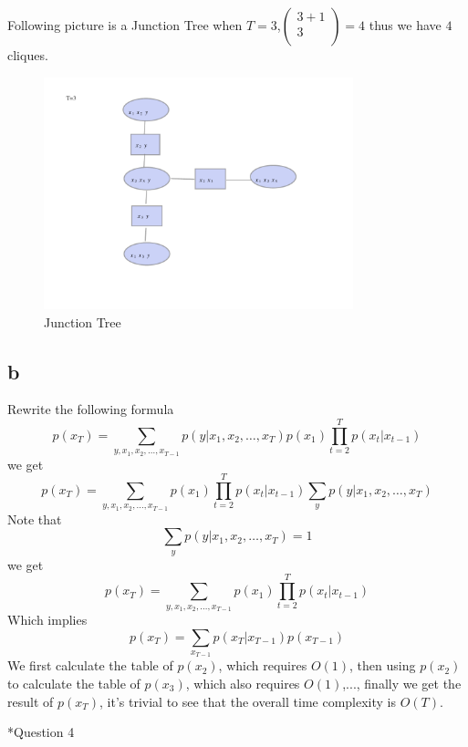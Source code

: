 \documentclass[12pt]{amsart}
\makeatletter
\renewcommand{\section}{\@startsection{section}{1}{0mm}
{-\baselineskip}{0.5\baselineskip}{\bf\leftline}}
\makeatother
\begin{document}
Following picture is a Junction Tree when $T=3$,$\left(
\begin{array}{c}
 3+1 \\
 3 \\
\end{array}
\right)=4$ thus we have $4$ cliques.
\begin{figure}[H]
  \centering
  \includegraphics[width=0.8\textwidth]{JT_Q3.pdf}
  \caption{Junction Tree}
\end{figure}

\subsection*{b}
Rewrite the following formula
$$p(x_T)=\sum_{y,x_1,x_2,\ldots,x_{T-1}}p(y|x_1,x_2,\ldots,x_T)p(x_1)\prod_{t=2}^Tp(x_t|x_{t-1})$$
we get
$$p(x_T)=\sum_{y,x_1,x_2,\ldots,x_{T-1}}p(x_1)\prod_{t=2}^Tp(x_t|x_{t-1})\sum_yp(y|x_1,x_2,\ldots,x_T)$$
Note that
$$\sum_yp(y|x_1,x_2,\ldots,x_T)=1$$
we get
$$p(x_T)=\sum_{y,x_1,x_2,\ldots,x_{T-1}}p(x_1)\prod_{t=2}^Tp(x_t|x_{t-1})$$
Which implies
$$p(x_T)=\sum_{x_{T-1}}p(x_T|x_{T-1})p(x_{T-1})$$
We first calculate the table of $p(x_2)$, which requires $O(1)$, then using $p(x_2)$ to calculate the table of $p(x_3)$, which also requires $O(1)$,..., finally we get the result of $p(x_T)$, it's trivial to see that the overall time complexity is $O(T)$.

\section*{Question 4}
\end{document}
